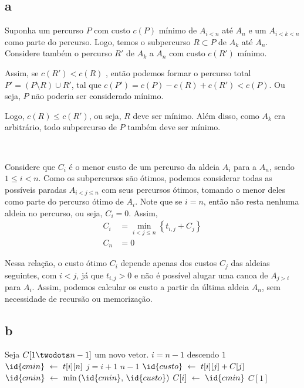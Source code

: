 \subsection{a} \label{sec:2:a}

Suponha um percurso $P$ com custo $c(P)$ mínimo de $A_{i < n}$ até $A_n$ e um $A_{i < k < n}$ como parte do percurso. Logo, temos o subpercurso $R \subset P$ de $A_k$ até $A_n$. Considere também o percurso $R'$ de $A_k$ a $A_n$ com custo $c\left(R'\right)$ mínimo.

Assim, se $c\left(R'\right) < c(R)$ , então podemos formar o percurso total $P' = (P \setminus R) \cup R'$, tal que $c\left(P'\right) = c(P) - c(R) + c\left(R'\right) < c(P)$. Ou seja, $P$ não poderia ser considerado mínimo.

Logo, $c(R) \leq c\left(R'\right)$, ou seja, $R$ deve ser mínimo. Além disso, como $A_k$ era arbitrário, todo subpercurso de $P$ também deve ser mínimo.

~

Considere que $C_i$ é o menor custo de um percurso da aldeia $A_i$ para a $A_n$, sendo $1 \leq i < n$. Como os subpercursos são ótimos, podemos considerar todas as possíveis paradas $A_{i < j \leq n}$ com seus percursos ótimos, tomando o menor deles como parte do percurso ótimo de $A_i$. Note que se $i = n$, então não resta nenhuma aldeia no percurso, ou seja, $C_i = 0$. Assim,
\begin{align*}
    C_i &= \min_{i < j \leq n}\left\{t_{i, j} + C_j\right\} \\
    C_n &= 0
\end{align*}

Nessa relação, o custo ótimo $C_i$ depende apenas dos custos $C_j$ das aldeias seguintes, com $i < j$, já que $t_{i, j} > 0$ e não é possível alugar uma canoa de $A_{j > i}$ para $A_i$. Assim, podemos calcular os custo a partir da última aldeia $A_n$, sem necessidade de recursão ou memorização.

\itemdsep
\subsection{b}

\begin{codebox}
    \li Seja $C[1 \twodots n - 1]$ um novo vetor. \label{linha:a1:1}
    \li
    \li {} $i = n - 1$ descendo  $1$ \label{linha:for:1}
        \Do
    \li     $\id{cmin} \gets t[i][n]$ \label{linha:a2:1}
    \li     {} $j = i + 1$  $n - 1$ \label{linha:for:2}
            \Do
    \li         $\id{custo} \gets t[i][j] + C[j]$ \label{linha:a3:1}
    \li         $\id{cmin} \gets \min\left(\id{cmin},\, \id{custo}\right)$ \label{linha:a3:2}
            \End
    \li     $C[i] \gets \id{cmin}$ \label{linha:a2:2}
        \End
    \li
    \li {} $C[1]$ \label{linha:a1:2}
\end{codebox}


